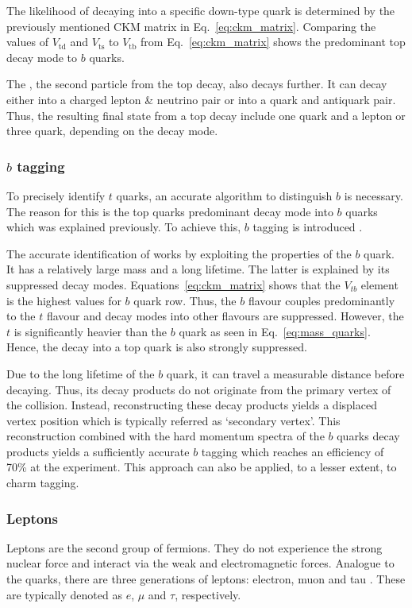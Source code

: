 \documentclass[bachelor,ngerman,english]{GAUBM}
\begin{document}
The likelihood of decaying into a specific down-type quark is determined by the previously mentioned CKM matrix in Eq.~\ref{eq:ckm_matrix}. Comparing the values of $V_\text{td}$ and $V_\text{ts}$ to $V_\text{tb}$ from Eq.~\ref{eq:ckm_matrix} shows the predominant top decay mode to $b$ quarks.
 
The \wboson, the second particle from the top decay, also decays further. It can decay either into a charged lepton \& neutrino pair or into a quark and antiquark pair. Thus, the resulting final state from a top decay include one quark and a lepton or three quark, depending on the \wboson decay mode. 

\subsubsection*{$b$ tagging}
To precisely identify $t$ quarks, an accurate algorithm to distinguish $b$ is necessary. The reason for this is the top quarks predominant decay mode into $b$ quarks which was explained previously. To achieve this, $b$ tagging is introduced \cite{btag:atlas,btag:cms}.

The accurate identification of works by exploiting the properties of the $b$ quark. It has a relatively large mass and a long lifetime. The latter is explained by its suppressed decay modes. Equations~\ref{eq:ckm_matrix} shows that the $V_{tb}$ element is the highest values for $b$ quark row. Thus, the $b$ flavour couples predominantly to the $t$ flavour and decay modes into other flavours are suppressed. However, the $t$ is significantly heavier than the $b$ quark as seen in Eq.~\ref{eq:mass_quarks}. Hence, the decay into a top quark is also strongly suppressed.

Due to the long lifetime of the $b$ quark, it can travel a measurable distance before decaying. Thus, its decay products do not originate from the primary vertex of the collision. Instead, reconstructing these decay products yields a displaced vertex position which is typically referred as `secondary vertex'. This reconstruction combined with the hard momentum spectra of the $b$ quarks decay products yields a sufficiently accurate $b$ tagging which reaches an efficiency of 70\% \cite{btag:performance} at the \atlas experiment. This approach can also be applied, to a lesser extent, to charm tagging. 


\subsubsection*{Leptons}
Leptons are the second group of fermions. They do not experience the strong nuclear force and interact via the weak and electromagnetic forces. Analogue to the quarks, there are three generations of leptons: electron, muon and tau \cite{theory:general_sm}. These are typically denoted as $e$, $\mu$ and $\tau$, respectively.
\end{document}
